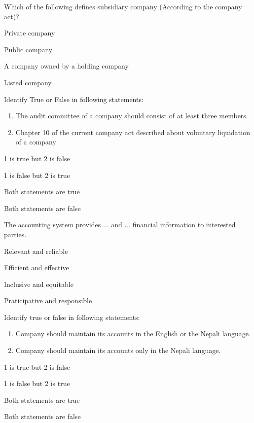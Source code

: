 \begin{questions}
\question Which of the following defines subsidiary company (According to the company act)?
  \begin{items}
  \item Private company
  \item Public company
  \item A company owned by a holding company
  \item Listed company
  \end{items}

\question Identify True or False in following statements:
  \begin{enumerate}
  \item The audit committee of a company should consist of at least three members.
  \item Chapter 10 of the current company act described about voluntary liquidation of a company
  \end{enumerate}
  \begin{items}
  \item 1 is true but 2 is false
  \item 1 is false but 2 is true
  \item Both statements are true
  \item Both statements are false
  \end{items}

\question The accounting system provides ... and ... financial information to interested parties.
  \begin{items}
  \item Relevant and reliable
  \item Efficient and effective
  \item Inclusive and equitable
  \item Praticipative and responsible
  \end{items}

\question Identify true or false in following statements:
  \begin{enumerate}
  \item Company should maintain its accounts in the English or the Nepali language.
  \item Company should maintain its accounts only in the Nepali language.
  \end{enumerate}
  \begin{items}
  \item 1 is true but 2 is false
  \item 1 is false but 2 is true
  \item Both statements are true
  \item Both statements are false
  \end{items}


\end{questions}
